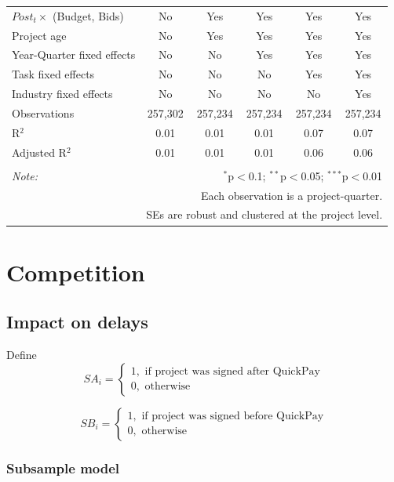 \documentclass[
]{article}
\begin{document}
\begin{table}[H]
\begin{tabular}{@{\extracolsep{-2pt}}lccccc}
$Post_t \times $  (Budget, Bids) & No & Yes & Yes & Yes & Yes \\ 
Project age & No & Yes & Yes & Yes & Yes \\ 
Year-Quarter fixed effects & No & No & Yes & Yes & Yes \\ 
Task fixed effects & No & No & No & Yes & Yes \\ 
Industry fixed effects & No & No & No & No & Yes \\ 
Observations & 257,302 & 257,234 & 257,234 & 257,234 & 257,234 \\ 
R$^{2}$ & 0.01 & 0.01 & 0.01 & 0.07 & 0.07 \\ 
Adjusted R$^{2}$ & 0.01 & 0.01 & 0.01 & 0.06 & 0.06 \\ 
\hline 
\hline \\[-1.8ex] 
\textit{Note:}  & \multicolumn{5}{r}{$^{*}$p$<$0.1; $^{**}$p$<$0.05; $^{***}$p$<$0.01} \\ 
 & \multicolumn{5}{r}{Each observation is a project-quarter.} \\ 
 & \multicolumn{5}{r}{SEs are robust and clustered at the project level.} \\ 
\end{tabular} 
\end{table}

\hypertarget{competition}{%
\section{Competition}\label{competition}}

\hypertarget{impact-on-delays}{%
\subsection{Impact on delays}\label{impact-on-delays}}

Define
\[ SA_i = \begin{cases} 1, \text{ if project was signed after QuickPay}\\
0, \text{ otherwise} \end{cases}\]

\[ SB_i = \begin{cases} 1, \text{ if project was signed before QuickPay}\\
0, \text{ otherwise} \end{cases}\]

\hypertarget{subsample-model}{%
\subsubsection{Subsample model}\label{subsample-model}}
\end{document}
